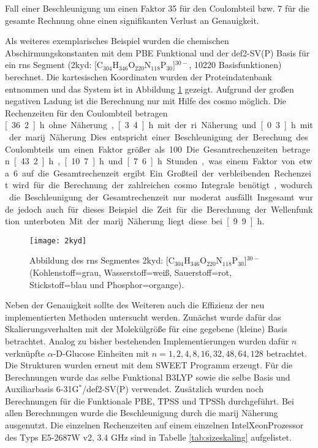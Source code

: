 Fall einer Beschleunigung um einen Faktor 35 für den Coulombteil bzw. 7 für die gesamte Rechnung ohne einen signifikanten Verlust an Genauigkeit. 

Als weiteres exemplarisches Beispiel wurden die chemischen Abschirmungskonstanten mit dem PBE Funktional und der def2-SV(P) Basis für ein \ac{rns} Segment (2kyd\supercite{2kydstructure}: [C$_{304}$H$_{346}$O$_{220}$N$_{118}$P$_{30}$]$^{30-}$, 10220 Basisfunktionen) berechnet. Die kartesischen Koordinaten wurden der Proteindatenbank entnommen und das System ist in Abbildung \ref{abb:2kyd} gezeigt. Aufgrund der großen negativen Ladung ist die Berechnung nur mit Hilfe des \ac{cosmo} möglich. Die Rechenzeiten für den Coulombteil betragen \unit[36.2]{h} ohne Näherung, \unit[3.4]{h} mit der \ac{ri} Näherung und \unit[0.3]{h} mit der \ac{marij} Näherung. Dies entspricht einer Beschleunigung der Berechung des Coulombteils um einen Faktor größer als 100. Die Gesamtrechenzeiten betragen \unit[43.2]{h}, \unit[10.7]{h} und \unit[7.6]{h} Stunden, was einem Faktor von etwa 6 auf die Gesamtrechenzeit ergibt. Ein Großteil der verbleibenden Rechenzeit wird für die Berechnung der zahlreichen \ac{cosmo} Integrale benötigt, wodurch die Beschleunigung der Gesamtrechenzeit nur moderat ausfällt. Insgesamt wurde jedoch auch für dieses Beispiel die Zeit für die Berechnung der Wellenfunktion unterboten. Mit der \ac{marij} Näherung liegt diese bei \unit[9.9]{h}.

\begin{figure}[ht!]
	\centering
	\texttt{[image: 2kyd]}
	\captionsetup{figurewithin = chapter}
	\captionsetup{font=small, labelfont=bf}\caption[{Abbildung eines \ac{rns} Segmentes}]{Abbildung des \ac{rns} Segmentes 2kyd: [C$_{304}$H$_{346}$O$_{220}$N$_{118}$P$_{30}$]$^{30-}$ (Kohlenstoff=grau, Wasserstoff=weiß, Sauerstoff=rot, Stickstoff=blau und Phosphor=organge).}
\label{abb:2kyd}
\end{figure}

\bigskip
Neben der Genauigkeit sollte des Weiteren auch die Effizienz der neu implementierten Methoden untersucht werden. Zunächst wurde dafür das Skalierungsverhalten mit der Molekülgröße für eine gegebene (kleine) Basis betrachtet. Analog zu bisher bestehenden Implementierungen\supercite{beer2011nuclei,kumar2016nuclei} wurden dafür $n$ verknüpfte $\alpha$-D-Glucose Einheiten mit $n=1,2,4,8,16,32,48,64,128$ betrachtet. Die Strukturen wurden erneut mit dem SWEET Programm erzeugt. Für die Berechnungen wurde das selbe Funktional B3LYP\supercite{becke1993density,lee1988development,stephens1994ab} sowie die selbe Basis und Auxiliarbasis 6-31G$^*$/def2-SV(P) verwendet. Zusätzlich wurden noch Berechnungen für die Funktionale PBE, TPSS und TPSSh durchgeführt. Bei allen Berechnungen wurde die Beschleunigung durch die \ac{marij} Näherung ausgenutzt. Die einzelnen Rechenzeiten auf einem einzelnen Intel\textregistered Xeon\textregistered Prozessor des Typs E5-2687W v2, 3.4 GHz sind in Tabelle \ref{tab:sizeskaling} aufgelistet. 

